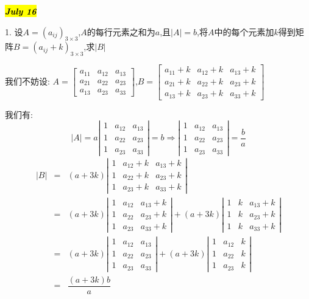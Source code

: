 \hl{\textbf{\textit{July 16}}}

1. 设$A=(a_{ij})_{3\times 3}$,$A$的每行元素之和为$a$,且$|A|=b$,将$A$中的每个元素加$k$得到矩阵$B=(a_{ij}+k)_{3\times 3}$,求$|B|$
\begin{solution}
	
	我们不妨设: $A=\left[\begin{matrix}
		a_{11}&a_{12}&a_{13}\\a_{21}&a_{22}&a_{23}\\a_{13}&a_{23}&a_{33}
	\end{matrix} \right] $,$B=\left[\begin{matrix}
		a_{11}+k&a_{12}+k&a_{13}+k\\a_{21}+k&a_{22}+k&a_{23}+k\\a_{13}+k&a_{23}+k&a_{33}+k
	\end{matrix} \right] $
	
	我们有: 
	$$|A|=a\left|\begin{matrix}
		1&a_{12}&a_{13}\\1&a_{22}&a_{23}\\1&a_{23}&a_{33}\end{matrix} \right|=b\Rightarrow \left| \begin{matrix}1&a_{12}&a_{13}\\1&a_{22}&a_{23}\\1&a_{23}&a_{33}\end{matrix}\right|=\dfrac{b}{a}$$
	\begin{eqnarray*}
		|B|&=&(a+3k)\left|\begin{matrix} 1&a_{12}+k&a_{13}+k\\1&a_{22}+k&a_{23}+k\\1&a_{23}+k&a_{33}+k\end{matrix} \right|\\
		&=&(a+3k)\left|\begin{matrix} 1&a_{12}&a_{13}+k\\1&a_{22}&a_{23}+k\\1&a_{23}&a_{33}+k\end{matrix} \right|+(a+3k)\left|\begin{matrix} 1&k&a_{13}+k\\1&k&a_{23}+k\\1&k&a_{33}+k\end{matrix}\right|\\
		&=&(a+3k)\left|\begin{matrix} 1&a_{12}&a_{13}\\1&a_{22}&a_{23}\\1&a_{23}&a_{33}\end{matrix}\right|+(a+3k)\left|\begin{matrix} 1&a_{12}&k\\1&a_{22}&k\\1&a_{23}&k\end{matrix}\right|\\
		&=&\dfrac{(a+3k)b}{a}
	\end{eqnarray*}
\end{solution}

